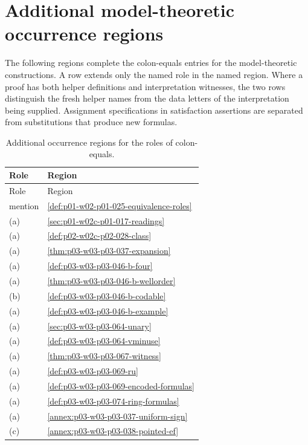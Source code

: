 \section{Additional model-theoretic occurrence regions}
\label{sec:p01-w02b-p01-013-route-instances}

The following regions complete the colon-equals entries for the model-theoretic
constructions.  A row extends only the named role in the named region.
Where a proof has both helper definitions and interpretation witnesses, the
two rows distinguish the fresh helper names from the data letters of the
interpretation being supplied.  Assignment specifications in satisfaction
assertions are separated from substitutions that produce new formulas.

\begingroup\small
\begin{longtable}{@{}p{}p{}@{}}
\caption{Additional occurrence regions for the roles of colon-equals.}
\label{tab:p01-w02b-p01-013-route-instances}\\
\toprule Role & Region \\
\midrule\endfirsthead
\toprule Role & Region \\
\midrule\endhead
\bottomrule\endlastfoot
mention & \cref{def:p01-w02-p01-025-equivalence-roles} \\
(a) & \cref{sec:p01-w02c-p01-017-readings} \\
(a) & \cref{def:p02-w02c-p02-028-class} \\
(a) & \cref{thm:p03-w03-p03-037-expansion} \\
(a) & \cref{def:p03-w03-p03-046-b-four} \\
(a) & \cref{thm:p03-w03-p03-046-b-wellorder} \\
(b) & \cref{def:p03-w03-p03-046-b-codable} \\
(a) & \cref{def:p03-w03-p03-046-b-example} \\
(a) & \cref{sec:p03-w03-p03-064-unary} \\
(a) & \cref{def:p03-w03-p03-064-vminuse} \\
(a) & \cref{thm:p03-w03-p03-067-witness} \\
(a) & \cref{def:p03-w03-p03-069-ru} \\
(a) & \cref{def:p03-w03-p03-069-encoded-formulas} \\
(a) & \cref{def:p03-w03-p03-074-ring-formulas} \\
(a) & \cref{annex:p03-w03-p03-037-uniform-sign} \\
(c) & \cref{annex:p03-w03-p03-038-pointed-ef} \\

\end{longtable}
